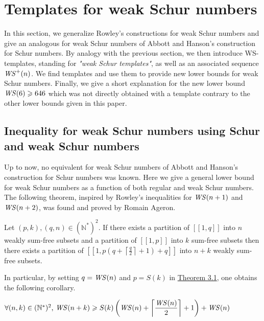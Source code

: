 \section{Templates for weak Schur numbers}
\label{WeakSchur}

\qquad In this section, we generalize Rowley's constructions for weak Schur numbers \cite{RowleyWS} and give an analogous
for weak Schur numbers of Abbott and Hanson's construction for Schur numbers. By analogy with the previous section,
we then introduce WS-templates, standing for \textit{"weak Schur templates"}, as well as an associated sequence \(\mathit{WS}^+(n)\). 
We find templates and use them to provide new lower bounds for weak Schur numbers. Finally, we give a short explanation for 
the new lower bound \(\mathit{WS}(6) \geqslant 646\) which was not directly obtained with a template contrary to the other lower bounds 
given in this paper.

\subsection{Inequality for weak Schur numbers using Schur and weak Schur numbers}

\qquad Up to now, no equivalent for weak Schur numbers of Abbott and Hanson's construction for Schur numbers
\cite{AbbottHanson} was known. Here we give a general lower bound for weak Schur numbers as a function of both
regular and weak Schur numbers. The following theorem, inspired by Rowley's inequalities for \(\mathit{WS} (n+1)\) and
\(\mathit{WS} (n+2)\), was found and proved by Romain Ageron.

\begin{theorem}
\label{Theorem3.1}
\begin{sloppypar}
Let \((p,k), (q,n) \in (\mathbb{N}^*)^2\). If there exists a partition of \([\![1,q]\!]\) into \(n\) weakly sum-free
subsets and a partition of \([\![1,p]\!]\) into \(k\) sum-free
subsets then there exists a partition of \({[\![1,p(q+\left \lceil \frac{q}{2} \right \rceil + 1)+q]\!]}\) into \(n+k\)
weakly sum-free subsets.
\end{sloppypar}
\end{theorem}

In particular, by setting \(q = \mathit{WS} (n)\) and \(p = S(k)\) in \hyperref[Theorem3.1]{Theorem 3.1}, one obtains the following corollary.

\begin{corollary}
\label{Corollary3.2}
\( \forall (n,k) \in (\mathbb{N}^*)^2 \text{, } \mathit{WS} (n+k) \geqslant S(k) \left (\mathit{WS} (n) + \left \lceil \displaystyle \frac{\mathit{WS} (n)}{2}
\right \rceil +1 \right) + \mathit{WS} (n)\)
\end{corollary}

